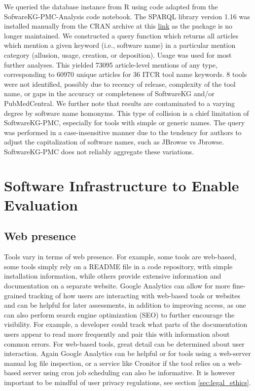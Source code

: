 \documentclass{article}
\begin{document}
We queried the database instance from R using code adapted from the SofwareKG-PMC-Analysis code notebook. The SPARQL library version 1.16 was installed manually from the CRAN archive at this \href{https://urldefense.com/v3/__https://cran.r-project.org/src/contrib/Archive/SPARQL/__;!!GuAItXPztq0!hBzPcpXZ3SCNtkVgVI9KgwxhTOgm6JY1gKzCzCFfer1uhtTUx-sWnQyzKdfDCT0yogPVN8-gs4KZy97R-JH4PN6VyojsQgQ$}{link} as the package is no longer maintained. We constructed a query function which returns all articles which mention a given keyword (i.e., software name) in a particular mention category (allusion, usage, creation, or deposition). Usage was used for most further analyses. This yielded 73095 article-level mentions of any type, corresponding to 60970 unique articles for 36 ITCR tool name keywords. 8 tools were not identified, possibly due to recency of release, complexity of the tool name, or gaps in the accuracy or completeness of SoftwareKG and/or PubMedCentral. We further note that results are contaminated to a varying degree by software name homonyms. This type of collision is a chief limitation of SoftwareKG-PMC, especially for tools with simple or generic names. The query was performed in a case-insensitive manner due to the tendency for authors to adjust the capitalization of software names, such as JBrowse vs Jbrowse. SoftwareKG-PMC does not reliably aggregate these variations.



\section{Software Infrastructure to Enable Evaluation}
\label{sec-supp-note-inf}

\subsection{Web presence}
Tools vary in terms of web presence. For example, some tools are web-based, some tools simply rely on a README file in a code repository, with simple installation information, while others provide extensive information and documentation on a separate website. Google Analytics can allow for more fine-grained tracking of how users are interacting with web-based tools or websites and can be helpful for later assessments, in addition to improving access, as one can also perform search engine optimization (SEO) to further encourage the visibility. For example, a developer could track what parts of the documentation users appear to read more frequently and pair this with information about common errors. For web-based tools, great detail can be determined about user interaction. Again Google Analytics can be helpful or for tools using a web-server manual log file inspection, or a service like Cronitor \cite{cronitor}  if the tool relies on a web-based server using cron \cite{cron_2009} job scheduling can also be informative.  It is however important to be mindful of user privacy regulations, see section \ref{sec:legal_ethics}.
\end{document}
